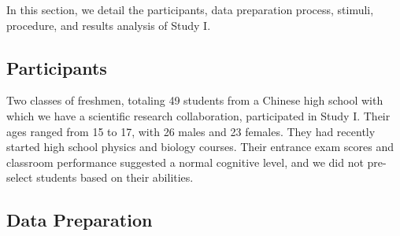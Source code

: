 In this section, we detail the participants, data preparation process, stimuli, procedure, and results analysis of Study I.


\subsection{Participants} 
\label{sec:study1_participants}
Two classes of freshmen, totaling 49  students from a Chinese high school with which we have a scientific research collaboration, participated in Study I. 
Their ages ranged from 15 to 17, with 26 males and 23 females. 
They had recently started high school physics and biology courses. 
Their entrance exam scores and classroom performance suggested a normal cognitive level, and we did not pre-select students based on their abilities.





\subsection{Data Preparation}
\label{sec:study1_data_preparation}

